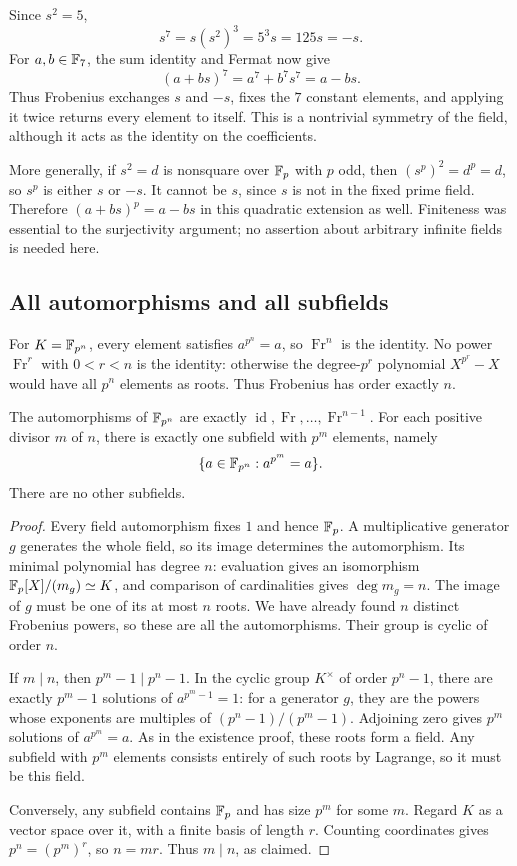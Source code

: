 \begin{example}
Since $s^2=5$,
\[
 s^7=s(s^2)^3=5^3s=125s=-s.
\]
For $a,b\in\mathbb F_7$, the sum identity and Fermat now give
\[
 (a+bs)^7=a^7+b^7s^7=a-bs.
\]
Thus Frobenius exchanges $s$ and $-s$, fixes the $7$ constant elements,
and applying it twice returns every element to itself. This is a
nontrivial symmetry of the field, although it acts as the identity on
the coefficients.
\end{example}

More generally, if $s^2=d$ is nonsquare over $\mathbb F_p$ with $p$ odd,
then $(s^p)^2=d^p=d$, so $s^p$ is either $s$ or $-s$.
It cannot be $s$, since $s$ is not in the fixed prime field.
Therefore $(a+bs)^p=a-bs$ in this quadratic extension as well.
Finiteness was essential to the surjectivity argument; no assertion
about arbitrary infinite fields is needed here.

\subsection*{All automorphisms and all subfields}

For $K=\mathbb F_{p^n}$, every element satisfies $a^{p^n}=a$, so
$\operatorname{Fr}^n$ is the identity. No power
$\operatorname{Fr}^r$ with $0<r<n$ is the identity: otherwise the
degree-$p^r$ polynomial $X^{p^r}-X$ would have all $p^n$ elements as roots.
Thus Frobenius has order exactly $n$.

\begin{proposition}
The automorphisms of $\mathbb F_{p^n}$ are exactly
$\operatorname{id},\operatorname{Fr},\ldots,\operatorname{Fr}^{n-1}$.
For each positive divisor $m$ of $n$, there is exactly one subfield
with $p^m$ elements, namely
\[
\{a\in\mathbb F_{p^n}:a^{p^m}=a\}.
\]
There are no other subfields.
\end{proposition}
\begin{proof}
Every field automorphism fixes $1$ and hence $\mathbb F_p$. A multiplicative
generator $g$ generates the whole field, so its image determines the
automorphism. Its minimal polynomial has degree $n$: evaluation gives
an isomorphism $\mathbb F_p[X]/(m_g)\simeq K$, and comparison of cardinalities
gives $\deg m_g=n$. The image of $g$ must be one of its at most $n$
roots. We have already found $n$ distinct Frobenius powers, so these
are all the automorphisms. Their group is cyclic of order $n$.

If $m\mid n$, then $p^m-1\mid p^n-1$. In the cyclic group
$K^\times$ of order $p^n-1$, there are exactly $p^m-1$ solutions of
$a^{p^m-1}=1$: for a generator $g$, they are the powers whose exponents
are multiples of $(p^n-1)/(p^m-1)$. Adjoining zero gives $p^m$
solutions of $a^{p^m}=a$. As in the existence proof, these roots form
a field. Any subfield with $p^m$ elements consists entirely of such
roots by Lagrange, so it must be this field.

Conversely, any subfield contains $\mathbb F_p$ and has size $p^m$ for some
$m$. Regard $K$ as a vector space over it, with a finite basis of
length $r$. Counting coordinates gives $p^n=(p^m)^r$, so $n=mr$.
Thus $m\mid n$, as claimed.
\end{proof}

